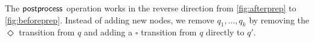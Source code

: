 The $\operatorname{\textsf{postprocess}}$ operation works in the reverse direction from \autoref{fig:afterprep} to \autoref{fig:beforeprep}. Instead of adding new nodes, we remove $q_{1},\dots,q_{k}$ by removing the $\Diamond$ transition from $q$ and adding a $\square$ transition from $q$ directly to $q'$.






%
%
%
%
%







